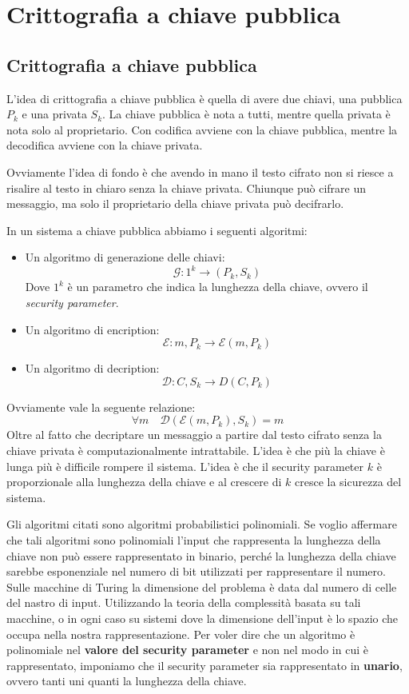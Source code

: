 \chapter{Crittografia a chiave pubblica}
\section{Crittografia a chiave pubblica}
L'idea di crittografia a chiave pubblica è quella di avere due chiavi, una
pubblica $P_k$ e una privata $S_k$. La chiave pubblica è nota a tutti, mentre
quella privata è nota solo al proprietario. 
Con codifica avviene con la chiave pubblica, mentre la decodifica avviene con la
chiave privata.

Ovviamente l'idea di fondo è che avendo in mano il testo cifrato non si riesce a
risalire al testo in chiaro senza la chiave privata. Chiunque può cifrare un
messaggio, ma solo il proprietario della chiave privata può decifrarlo.

In un sistema a chiave pubblica abbiamo i seguenti algoritmi:
\begin{itemize}
    \item Un algoritmo di generazione delle chiavi:
    \[
        \mathcal{G}: 1^k \to (P_k, S_k) 
    \]
    Dove $1^k$ è un parametro che indica la lunghezza della chiave, ovvero il \textit{security parameter}.
    \item Un algoritmo di encription:
      \[
        \mathcal{E}: m, P_k \to \mathcal{E}(m, P_k)
    \]
    \item Un algoritmo di decription:
    \[
          \mathcal{D}: C, S_k \to D(C, P_k)
    \]
\end{itemize}
Ovviamente vale la seguente relazione:
\begin{equation}
    \forall m \quad \mathcal{D}(\mathcal{E}(m, P_k), S_k) = m
\end{equation}
Oltre al fatto che decriptare un messaggio a partire dal testo cifrato senza 
la chiave privata è computazionalmente intrattabile. L'idea è che più la chiave
è lunga più è difficile rompere il sistema. L'idea è che il security parameter
$k$ è proporzionale alla lunghezza della chiave e al crescere di $k$ cresce
la sicurezza del sistema.

Gli algoritmi citati sono algoritmi probabilistici polinomiali. Se voglio 
affermare che tali algoritmi sono polinomiali l'input che rappresenta la 
lunghezza della chiave non può essere 
rappresentato in binario, perché la lunghezza della chiave sarebbe
esponenziale nel numero di bit utilizzati per rappresentare il numero. 
Sulle macchine di Turing la dimensione del problema è data dal numero di 
celle del nastro di input. Utilizzando la teoria della complessità 
basata su tali macchine, o in ogni caso su sistemi dove la dimensione 
dell'input è lo spazio che occupa nella nostra rappresentazione. Per 
voler dire che un algoritmo è polinomiale nel \textbf{valore del 
security parameter} e non nel modo in cui è rappresentato, imponiamo 
che il security parameter sia rappresentato in \textbf{unario}, ovvero 
tanti uni quanti la lunghezza della chiave.

